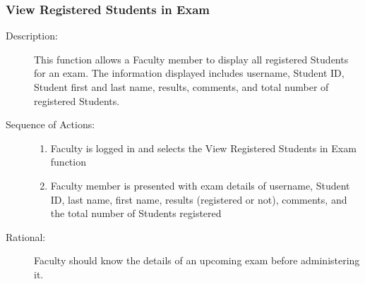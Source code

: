    \subsubsection{\large View Registered Students in Exam} 
   \begin{boxed} %
      \begin{description}
         \item[Description:\label{desc:view_registered}]
      This function allows a Faculty member to display all registered
         Students for an exam. The information displayed includes username,
         Student ID, Student first and last name, results, comments, and total number
         of registered Students. 
         
            \item[Sequence of Actions:]\hspace{10cm}
         \begin{enumerate}
            \item Faculty is logged in and selects the View Registered Students
               in Exam function
            \item Faculty member is presented with exam details of username,
               Student ID, last name, first name, results (registered or not),
               comments, and the total number of Students registered
         \end{enumerate}

            \item[Rational:]
         Faculty should know the details of an upcoming exam before
         administering it.
      \end{description}
   \end{boxed} %

